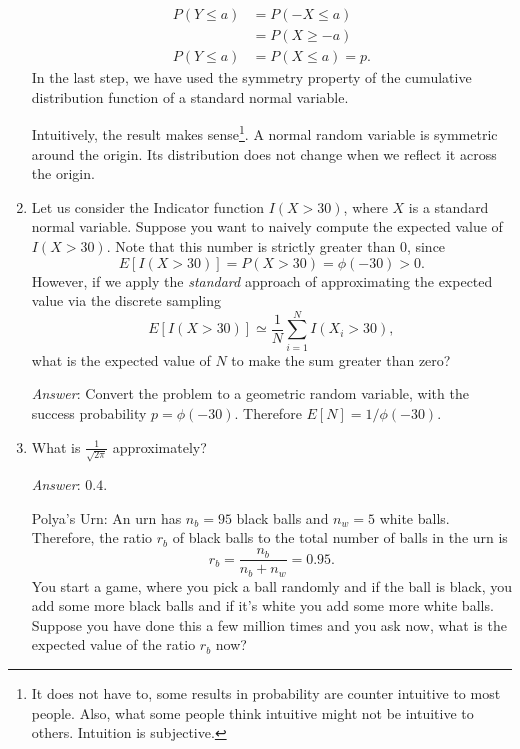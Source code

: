 \documentclass{amsart}
\theoremstyle{plain}
\numberwithin{equation}{section}
\begin{document}
\begin{enumerate}
\begin{align}
P( Y \leq a ) &= P( -X \leq a )\\
&= P( X \geq -a )\\
P( Y \leq a ) &= P( X \leq a ) = p.
\end{align}
In the last step, we have used the symmetry property of 
the cumulative distribution function of a standard normal 
variable. 

Intuitively, the result makes sense\footnote{It does not have to,
some results in probability are counter intuitive to most people. 
Also, what some people think intuitive might not be intuitive to 
others. Intuition is subjective.}. A normal 
random variable is symmetric around the origin. Its 
distribution does not change when we reflect it across the origin.

\item Let us consider the Indicator function $I(X>30)$, where
$X$ is a standard normal variable. 
Suppose you want to naively compute the expected value of 
$I(X>30)$. Note that this number is strictly greater than
$0$, since
\begin{equation*}
E[I(X>30)] = P(X>30) = \phi( -30 ) > 0.
\end{equation*}
However, if we apply the \emph{standard} approach 
of approximating the expected value via the 
discrete sampling
\begin{equation*}
E[I(X>30)] \simeq \frac{1}{N}\sum_{i=1}^{N} I(X_i>30), 
\end{equation*}
what is the expected value of $N$ to make the 
sum greater than zero?

\emph{Answer}: Convert the problem to 
a geometric random variable, with the 
success probability $p = \phi(-30)$. 
Therefore $E[N] = 1/\phi(-30)$. 

\item What is $\frac{1}{\sqrt{2\pi}}$ approximately?

\emph{Answer}: $0.4$.

Polya's Urn: An urn has $n_b=95$ black balls
and $n_w=5$ white balls. Therefore, the ratio 
$r_b$ of black balls to the total number of 
balls in the urn is 
\begin{equation}
r_b = \frac{n_b}{n_b + n_w} = 0.95.
\end{equation}
You start a game, where 
you pick a ball randomly and if the ball
is black, you 
add some more black balls and if it's white you 
add some more white balls. Suppose you have 
done this a few million times and you ask 
now, what is the expected value of the 
ratio $r_b$ now?


\end{enumerate}
\end{document}
